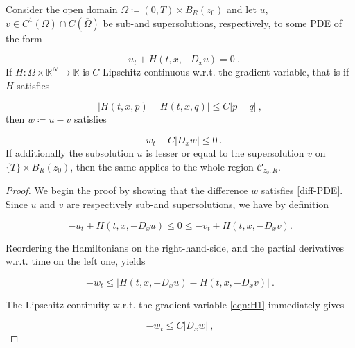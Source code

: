 \begin{theorem}
			\label{smooth_loc} 
			Consider the open domain $ \Omega \coloneqq \left( 0, T \right) \times B_R(z_0) $ and let $ u $, $ v \in C^{1}(\Omega) \cap C(\overline{\Omega}) $ be sub-and supersolutions, respectively, to some PDE of the form
			
			\begin{equation*}
				-u_t + H(t, x, -D_x u) = 0 \ .
			\end{equation*}
			If $ H : \Omega \times \mathbb{R}^{N} \to \mathbb{R} $ is $ C $-Lipschitz continuous w.r.t. the gradient variable, that is if $ H $ satisfies
			
			\begin{equation}
				\tag{H1}
				\lvert H(t, x, p) - H(t, x, q) \rvert \leq C \lvert p - q \rvert \ ,
				\label{eqn:H1}
			\end{equation}
			then $ w \coloneqq u - v $ satisfies
			
			\begin{equation}
				\label{diff-PDE}
				-w_t - C \lvert D_x w \rvert \leq 0 \ .
			\end{equation}
			If additionally the subsolution $ u $ is lesser or equal to the supersolution $ v $ on $ \{ T \} \times \overline{B}_R (z_0) $, then the same applies to the whole region $ \mathcal{C}_{z_0, R} $.
			
			\begin{proof}
				We begin the proof by showing that the difference $ w $ satisfies \eqref{diff-PDE}. Since $ u $ and $ v $ are respectively sub-and supersolutions, we have by definition
				
				\begin{equation*}
					-u_t + H(t, x, -D_x u) \leq 0 \leq -v_t + H(t, x, -D_x v) .
				\end{equation*}
				
				Reordering the Hamiltonians on the right-hand-side, and the partial derivatives w.r.t. time on the left one, yields
				
				\begin{equation*}
					-w_t \leq \lvert H(t, x, -D_x u) - H(t, x, -D_x v) \rvert \ .
				\end{equation*}
				
				The Lipschitz-continuity w.r.t. the gradient variable \eqref{eqn:H1} immediately gives
				
				\begin{equation*}
					-w_t \leq C \lvert D_x w \rvert \ ,
				\end{equation*}
				

\end{proof}
\end{theorem}
